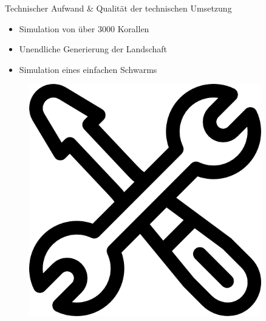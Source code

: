 \documentclass{beamer}
\begin{document}
\begin{frame}{Technischer Aufwand \& Qualität der technischen Umsetzung}
\begin{minipage}[c]{0.72\textwidth}
\begin{itemize}
\item Simulation von über 3000 Korallen
\item Unendliche Generierung der Landschaft
\item Simulation eines einfachen Schwarms
\end{itemize}
\end{minipage}
\hfill
\begin{minipage}[c]{0.25\textwidth}
\begin{figure}
\centering
\includegraphics[width=0.9\textwidth, keepaspectratio]{img/aufwand}
\caption{\cite{b}}
\end{figure}
\end{minipage}
\end{frame}
\end{document}
